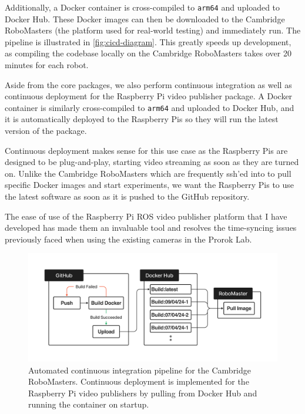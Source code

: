 Additionally, a Docker container is cross-compiled to \texttt{arm64} and uploaded to Docker Hub. These Docker images can then be downloaded to the Cambridge RoboMasters (the platform used for real-world testing) and immediately run. The pipeline is illustrated in \autoref{fig:cicd-diagram}. This greatly speeds up development, as compiling the codebase locally on the Cambridge RoboMasters takes over 20 minutes for each robot.

Aside from the core packages, we also perform continuous integration as well as continuous deployment for the Raspberry Pi video publisher package. A Docker container is similarly cross-compiled to \texttt{arm64} and uploaded to Docker Hub, and it is automatically deployed to the Raspberry Pis so they will run the latest version of the package.

Continuous deployment makes sense for this use case as the Raspberry Pis are designed to be plug-and-play, starting video streaming as soon as they are turned on. Unlike the Cambridge RoboMasters which are frequently ssh'ed into to pull specific Docker images and start experiments, we want the Raspberry Pis to use the latest software as soon as it is pushed to the GitHub repository.

The ease of use of the Raspberry Pi ROS video publisher platform that I have developed has made them an invaluable tool and resolves the time-syncing issues previously faced when using the existing cameras in the Prorok Lab.

\begin{figure}[h]
    \centering
    \includegraphics[trim=5cm 5cm 5cm 5cm, scale=0.2]{figures/cicd_diagram.pdf}

    \caption{Automated continuous integration pipeline for the Cambridge RoboMasters. Continuous deployment is implemented for the Raspberry Pi video publishers by pulling from Docker Hub and running the container on startup.}
    \label{fig:cicd-diagram}
\end{figure}


